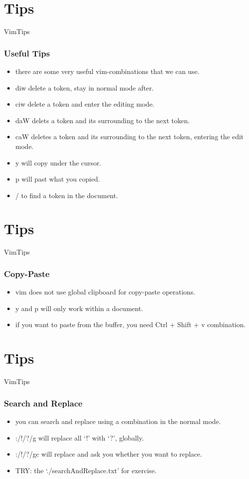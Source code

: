 \documentclass{beamer}
\begin{document}
\section{Tips}
\begin{frame}{VimTips}
    \frametitle{Useful Tips}
    \begin{itemize}
        \item there are some very useful vim-combinations that we can use.
        \item \textsf{diw} delete a token, stay in normal mode after.
        \item \textsf{ciw} delete a token and enter the editing mode.
        \item \textsf{daW} delets a token and its surrounding to the next token.
        \item \textsf{caW} deletes a token and its surrounding to the next token, entering the edit mode.
        \item \textsf{y} will copy under the cursor.
        \item \textsf{p} will past what you copied.
        \item \textsf{/} to find a token in the document.
    \end{itemize}
\end{frame}

\section{Tips}
\begin{frame}{VimTips}
    \frametitle{Copy-Paste}
    \begin{itemize}
        \item vim does not use global clipboard for copy-paste operations.
        \item \textsf{y} and \textsf{p} will only work within a document.
        \item if you want to paste from the buffer, you need \textsf{Ctrl} + \textsf{Shift} + \textsf{v} combination.
    \end{itemize}
\end{frame}

\section{Tips}
\begin{frame}{VimTips}
    \frametitle{Search and Replace}
    \begin{itemize}
        \item you can search and replace using a combination in the normal mode.
        \item \textsf{:/!/?/g} will replace all `!' with `?', globally.
        \item \textsf{:/!/?/gc} will replace and ask you whether you want to replace.
        \item TRY: the `./searchAndReplace.txt' for exercise.
    \end{itemize}
\end{frame}
\end{document}

